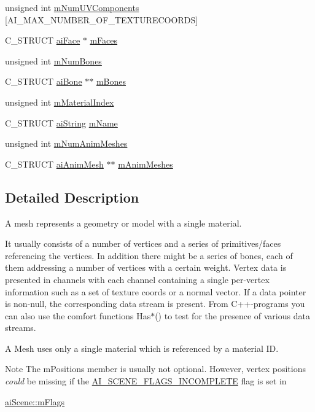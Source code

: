 \begin{DoxyCompactItemize}
\item 
unsigned int \hyperlink{structai_mesh_a635c631a6e66d32989d6b25b2a892d86}{m\-Num\-U\-V\-Components} \mbox{[}A\-I\-\_\-\-M\-A\-X\-\_\-\-N\-U\-M\-B\-E\-R\-\_\-\-O\-F\-\_\-\-T\-E\-X\-T\-U\-R\-E\-C\-O\-O\-R\-D\-S\mbox{]}
\item 
C\-\_\-\-S\-T\-R\-U\-C\-T \hyperlink{structai_face}{ai\-Face} $\ast$ \hyperlink{structai_mesh_a5a65fbc7fdea7f8d36f39047425ece07}{m\-Faces}
\item 
unsigned int \hyperlink{structai_mesh_a0f9d5425b6300e32a842a94f943fd79e}{m\-Num\-Bones}
\item 
C\-\_\-\-S\-T\-R\-U\-C\-T \hyperlink{structai_bone}{ai\-Bone} $\ast$$\ast$ \hyperlink{structai_mesh_a0c0582a7f45b340b6a33552c53232539}{m\-Bones}
\item 
unsigned int \hyperlink{structai_mesh_aa2807c7ba172115203ed16047ad65f9e}{m\-Material\-Index}
\item 
C\-\_\-\-S\-T\-R\-U\-C\-T \hyperlink{structai_string}{ai\-String} \hyperlink{structai_mesh_a8dd9433e0c5b008e3e5aee6c801d3b74}{m\-Name}
\item 
unsigned int \hyperlink{structai_mesh_a1692a300222b32348ae51779df4a697e}{m\-Num\-Anim\-Meshes}
\item 
C\-\_\-\-S\-T\-R\-U\-C\-T \hyperlink{structai_anim_mesh}{ai\-Anim\-Mesh} $\ast$$\ast$ \hyperlink{structai_mesh_a5078f7db7e99ed05db89dfa412f0e990}{m\-Anim\-Meshes}
\end{DoxyCompactItemize}


\subsection{Detailed Description}
A mesh represents a geometry or model with a single material. 

It usually consists of a number of vertices and a series of primitives/faces referencing the vertices. In addition there might be a series of bones, each of them addressing a number of vertices with a certain weight. Vertex data is presented in channels with each channel containing a single per-\/vertex information such as a set of texture coords or a normal vector. If a data pointer is non-\/null, the corresponding data stream is present. From C++-\/programs you can also use the comfort functions Has$\ast$() to test for the presence of various data streams.

A Mesh uses only a single material which is referenced by a material I\-D. \begin{DoxyNote}{Note}
The m\-Positions member is usually not optional. However, vertex positions {\itshape could} be missing if the \hyperlink{scene_8h_a64c3b662e066126207bb842fc406a745}{A\-I\-\_\-\-S\-C\-E\-N\-E\-\_\-\-F\-L\-A\-G\-S\-\_\-\-I\-N\-C\-O\-M\-P\-L\-E\-T\-E} flag is set in 
\begin{DoxyCode}
\hyperlink{structai_scene_a4091f10bb81e05db00ebc34f40c48f38}{aiScene::mFlags}
\end{DoxyCode}
 
\end{DoxyNote}


